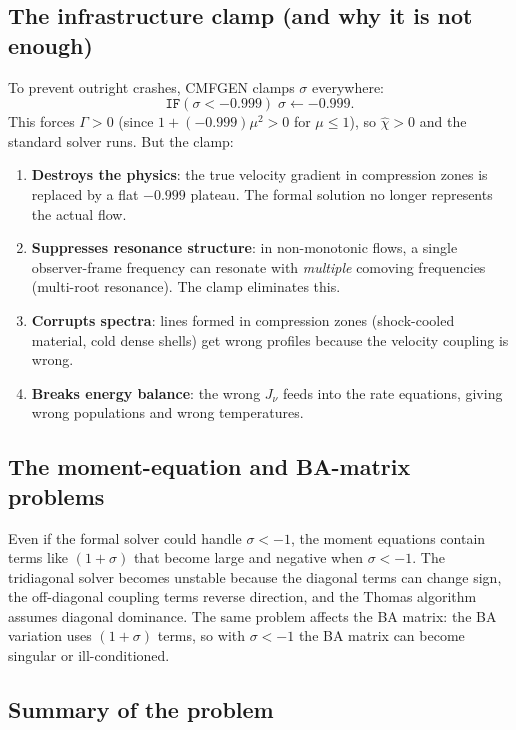 \documentclass[11pt]{article}
\begin{document}
\subsection{The infrastructure clamp (and why it is not enough)}

To prevent outright crashes, CMFGEN clamps $\sigma$ everywhere:
\[
  \texttt{IF}(\sigma < -0.999)\;\sigma \leftarrow -0.999 .
\]
This forces $\Gamma > 0$ (since $1 + (-0.999)\mu^{2} > 0$ for
$\mu \le 1$), so $\hat\chi > 0$ and the standard solver runs.  But the
clamp:

\begin{enumerate}[nosep]
  \item \textbf{Destroys the physics}: the true velocity gradient in
        compression zones is replaced by a flat $-0.999$ plateau.  The
        formal solution no longer represents the actual flow.
  \item \textbf{Suppresses resonance structure}: in non-monotonic flows,
        a single observer-frame frequency can resonate with
        \emph{multiple} comoving frequencies (multi-root resonance).
        The clamp eliminates this.
  \item \textbf{Corrupts spectra}: lines formed in compression zones
        (shock-cooled material, cold dense shells) get wrong profiles
        because the velocity coupling is wrong.
  \item \textbf{Breaks energy balance}: the wrong $J_\nu$ feeds into the
        rate equations, giving wrong populations and wrong temperatures.
\end{enumerate}

\subsection{The moment-equation and BA-matrix problems}

Even if the formal solver could handle $\sigma < -1$, the moment
equations contain terms like $(1 + \sigma)$ that become large and
negative when $\sigma < -1$.  The tridiagonal solver becomes unstable
because the diagonal terms can change sign, the off-diagonal coupling
terms reverse direction, and the Thomas algorithm assumes diagonal
dominance.  The same problem affects the BA matrix: the BA variation
uses $(1 + \sigma)$ terms, so with $\sigma < -1$ the BA matrix can
become singular or ill-conditioned.

\subsection{Summary of the problem}
\end{document}
